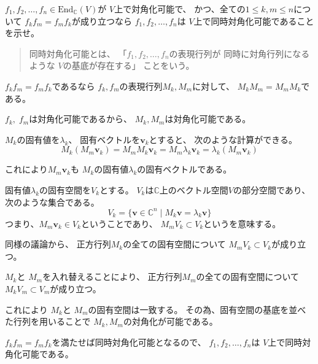 \documentclass[12pt,b5paper]{ltjsarticle}
\begin{document}
$f_{1},f_{2},\dots,f_{n} \in \mathrm{End}_{\mathbb{C}}(V)$が
$V$上で対角化可能で、
かつ、全ての$1\leq k,m \leq n$について
$f_{k}f_{m}=f_{m}f_{k}$が成り立つなら
$f_{1},f_{2},\dots,f_{n}$は
$V$上で同時対角化可能であることを示せ。

\begin{quote}
 同時対角化可能とは、
 「$f_{1},f_{2},\dots,f_{n}$の表現行列が
 同時に対角行列になるような
 $V$の基底が存在する」
 ことをいう。
\end{quote}

\dotfill

$f_{k}f_{m}=f_{m}f_{k}$であるなら
$f_{k},f_{m}$の表現行列$M_{k},M_{m}$に対して、
$M_{k}M_{m}=M_{m}M_{k}$である。

$f_{k},\;f_{m}$は対角化可能であるから、
$M_{k},M_{m}$は対角化可能である。


$M_{k}$の固有値を$\lambda_{k}$、
固有ベクトルを$\bm{v}_{k}$とすると、
次のような計算ができる。
\begin{equation}
 M_{k}(M_{m}\bm{v}_{k})
  = M_{m}M_{k}\bm{v}_{k}
  = M_{m}\lambda_{k}\bm{v}_{k}
  = \lambda_{k}(M_{m}\bm{v}_{k})
\end{equation}

これにより$M_{m}\bm{v}_{k}$も
$M_{k}$の固有値$\lambda_{k}$の固有ベクトルである。

固有値$\lambda_{k}$の固有空間を$V_{k}$とする。
$V_{k}$は$\mathbb{C}$上のベクトル空間$V$の部分空間であり、
次のような集合である。
\begin{equation}
 V_{k}=\{ \bm{v}\in \mathbb{C}^{n} \mid M_{k}\bm{v} = \lambda_{k}\bm{v} \}
\end{equation}
つまり、$M_{m}\bm{v}_{k} \in V_{k}$ということであり、
$M_{m} V_{k} \subset V_{k}$というを意味する。

同様の議論から、
正方行列$M_{k}$の全ての固有空間について
$M_{m} V_{k} \subset V_{k}$が成り立つ。

$M_{k}$と
$M_{m}$を入れ替えることにより、
正方行列$M_{m}$の全ての固有空間について
$M_{k} V_{m} \subset V_{m}$が成り立つ。

これにより
$M_{k}$と
$M_{m}$の固有空間は一致する。
その為、固有空間の基底を並べた行列を用いることで
$M_{k},M_{m}$の対角化が可能である。


$f_{k}f_{m}=f_{m}f_{k}$を満たせば同時対角化可能となるので、
$f_{1},f_{2},\dots,f_{n}$は
$V$上で同時対角化可能である。



\hrulefill
\end{document}
